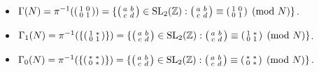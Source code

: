\begin{example}
\begin{itemize}
    \item $\Gamma(N) = \pi^{-1} (\begin{psmallmatrix}
        1 & 0 \\ 0 & 1
    \end{psmallmatrix}) = \{ \begin{psmallmatrix}
        a & b \\ c & d 
    \end{psmallmatrix} \in \operatorname{SL}_2(\mathbb{Z}): \begin{psmallmatrix}
        a & b \\ c & d 
    \end{psmallmatrix} \equiv \begin{psmallmatrix}
        1 & 0 \\ 0 & 1 
    \end{psmallmatrix} \pmod{N}\}$.
    \item $\Gamma_1(N) = \pi^{-1} (\{\begin{psmallmatrix}
        1 & \ast \\ 0 & 1
    \end{psmallmatrix}\}) = \{ \begin{psmallmatrix}
        a & b \\ c & d 
    \end{psmallmatrix} \in \operatorname{SL}_2(\mathbb{Z}): \begin{psmallmatrix}
        a & b \\ c & d 
    \end{psmallmatrix} \equiv \begin{psmallmatrix}
        1 & \ast \\ 0 & 1 
    \end{psmallmatrix} \pmod{N}\}$.
    \item $\Gamma_0(N) = \pi^{-1} (\{\begin{psmallmatrix}
        \ast & \ast \\ 0 & \ast
    \end{psmallmatrix}\}) = \{ \begin{psmallmatrix}
        a & b \\ c & d 
    \end{psmallmatrix} \in \operatorname{SL}_2(\mathbb{Z}): \begin{psmallmatrix}
        a & b \\ c & d 
    \end{psmallmatrix} \equiv \begin{psmallmatrix}
        \ast & \ast \\ 0 & \ast 
    \end{psmallmatrix} \pmod{N}\}$.
\end{itemize}
\end{example}

